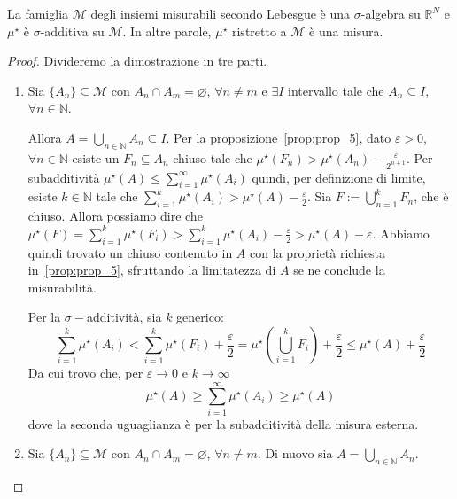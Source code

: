 \begin{theorem}
    La famiglia \(\mathcal{M}\) degli insiemi misurabili secondo Lebesgue è una
    \(\sigma\)-algebra su \(\mathbb{R}^{N}\) e \(\mu^\star\) è \(\sigma\)-additiva su
    \(\mathcal{M}\). In altre parole, \(\mu^\star\) ristretto a \(\mathcal{M}\)
    è una misura.
\end{theorem}
\begin{proof}
    Divideremo la dimostrazione in tre parti.
\begin{enumerate}[label = \arabic*.]
    \item Sia \(\{A_{n}\} \subseteq \mathcal{M} \) con \(A_{n} \cap A_{m} =
        \varnothing\), \(\forall n \neq m\) e \(\exists I\) intervallo tale che
        \(A_{n} \subseteq I \), \(\forall n \in \mathbb{N}\).

        Allora \(A = \bigcup_{n \in \mathbb{N}} A_{n} \subseteq I \). Per la
        proposizione~\ref{prop:prop_5}, dato
        \(\varepsilon > 0\), \(\forall n \in \mathbb{N}\) esiste un \(F_{n} \subseteq A_{n} \) chiuso tale che
        \(\mu^\star(F_{n}) > \mu^\star(A_{n}) - \frac{\varepsilon}{2^{n+1}}\).
        Per subadditività \(\mu^\star(A) \le \sum_{i=1}^{\infty} \mu^\star(A_{i}) \)
        quindi, per definizione di limite, esiste \(k \in \mathbb{N}\) tale che \(\sum_{i=1}^{k}
        \mu^\star(A_{i}) > \mu^\star(A) - \frac{\varepsilon}{2} \). Sia \(F :=
        \bigcup_{n = 1}^{k} F_{n} \), che è chiuso. Allora
        possiamo dire che \(\mu^\star(F) = \sum_{i=1}^{k} \mu^\star(F_{i}) >
        \sum_{i=1}^{k} \mu^\star(A_{i}) - \frac{\varepsilon}{2} > \mu^\star(A) -
        \varepsilon\). Abbiamo quindi trovato un chiuso contenuto in \(A\)
        con la proprietà richiesta in~\ref{prop:prop_5}, sfruttando la
        limitatezza di \(A\) se ne conclude la misurabilità.

        Per la \(\sigma-\)additività, sia \(k\) generico:
        \[
            \sum_{i=1}^{k} \mu^\star(A_{i}) < \sum_{i=1}^{k} \mu^\star(F_{i})  +
            \frac{\varepsilon}{2} = \mu^\star\left( \bigcup_{i = 1}^{k} F_{i}
            \right) + \frac{\varepsilon}{2} \le \mu^\star(A) +
            \frac{\varepsilon}{2}
        \]
        Da cui trovo che, per \(\varepsilon \to 0\) e \(k \to \infty\) 
        \[
            \mu^\star(A) \ge \sum_{i=1}^{\infty} \mu^\star(A_{i}) \ge
            \mu^\star(A)
        \]
        dove la seconda uguaglianza è per la subadditività della misura esterna.

    \item  Sia \(\{A_{n}\} \subseteq \mathcal{M} \) con \(A_{n} \cap A_{m} =
        \varnothing\), \(\forall n \neq m\). Di nuovo sia \(A = \bigcup_{n \in
        \mathbb{N}} A_{n}\).


\end{enumerate}
\end{proof}
